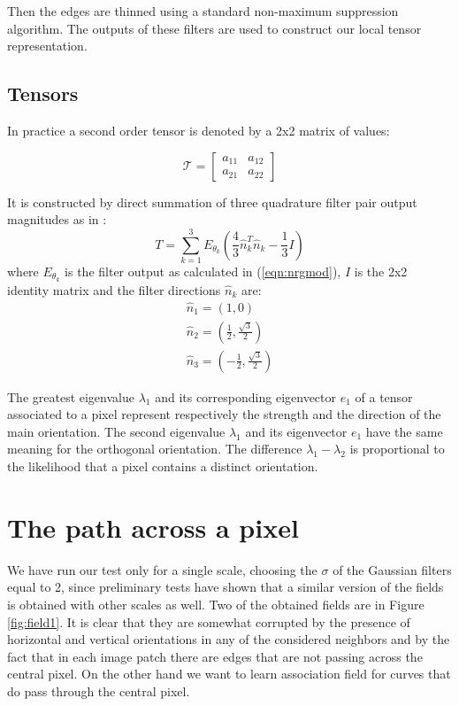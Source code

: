 \documentclass{llncs}
\begin{document}
Then the edges are thinned using a standard non-maximum
suppression algorithm.
The outputs of these filters are used to construct our local tensor
representation.



\subsection{Tensors}

In practice a second order tensor is denoted by a 2x2 matrix of values:

\begin{equation} \label{eqn:tensdef}
{\mathcal T}=\left[
\begin{array}{cc}
a_{11} & a_{12} \\ a_{21} & a_{22}
\end{array}
\right]
\end{equation}

It is constructed by direct summation of three quadrature filter pair output magnitudes as in \cite{Knutsson89}:
\begin{equation} \label{eqn:sumquad}
T=\sum^3_{k=1}E_{\theta_k}\left(\frac{4}{3}\hat{n}_k^T \hat{n}_k-\frac{1}{3}I\right)
\end{equation}
where $E_{\theta_k}$ is the filter output as calculated in (\ref{eqn:nrgmod}), $I$ is the 2x2 identity matrix and the filter directions $\hat{n}_k$ are:
\begin{equation} \label{eqn:fildir}
\begin{array}{lll}
\hat{n}_1=\left(1,0\right) \\
\hat{n}_2=\left(\frac{1}{2},\frac{\sqrt{3}}{2}\right) \\
\hat{n}_3=\left(-\frac{1}{2},\frac{\sqrt{3}}{2}\right)
\end{array}
\end{equation}

The greatest eigenvalue $\lambda_1$ and its corresponding eigenvector $e_1$ of a tensor associated to a pixel represent respectively the strength and the direction of the main orientation. The second eigenvalue $\lambda_1$ and its eigenvector $e_1$ have the same meaning for the orthogonal orientation. The difference $\lambda_1-\lambda_2$ is proportional to the likelihood that a pixel contains a distinct orientation.

\section{The path across a pixel}
\label{sec:ass_pre_res}
We have run our test only for a single scale, choosing the $\sigma$ of the Gaussian filters
equal to 2, since preliminary tests have shown that a similar version of the fields is obtained with other scales as well.
Two of the obtained fields are in Figure \ref{fig:field1}. It is clear that they are somewhat corrupted by the presence of horizontal and vertical orientations in any of the considered neighbors and by the fact that
in each image patch there are edges
that are not passing across the central pixel. On the other hand we want to learn association field for curves that do pass through the central pixel.
\end{document}
